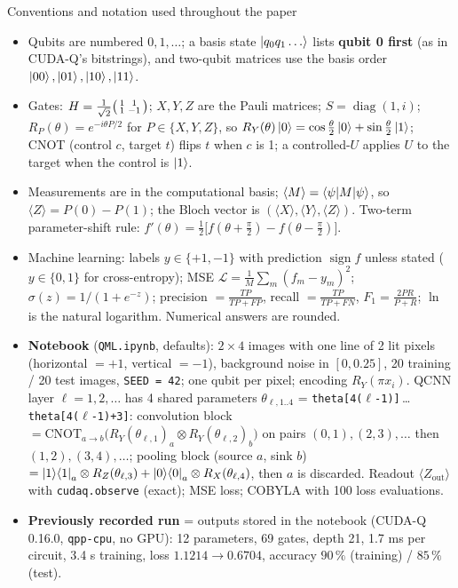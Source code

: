 \documentclass[11pt,a4paper]{article}
\begin{document}
\begin{infobox}{Conventions and notation used throughout the paper}
\footnotesize
\begin{itemize}[leftmargin=1.2em, itemsep=1pt, topsep=2pt]
\item Qubits are numbered $0, 1, \dots$; a basis state $\ket{q_0q_1\dots}$ lists \textbf{qubit 0 first} (as in CUDA-Q's bitstrings), and
      two-qubit matrices use the basis order $\ket{00}, \ket{01}, \ket{10}, \ket{11}$.
\item Gates: $H = \frac{1}{\sqrt2}\begin{psmallmatrix}1&1\\1&-1\end{psmallmatrix}$; $X, Y, Z$ are the Pauli matrices; $S = \operatorname{diag}(1, i)$;
      $R_P(\theta) = e^{-i\theta P/2}$ for $P \in \{X, Y, Z\}$, so $R_Y(\theta)\ket0 = \cos\frac\theta2\ket0 + \sin\frac\theta2\ket1$; CNOT (control $c$,
      target $t$) flips $t$ when $c$ is 1; a controlled-$U$ applies $U$ to the target when the control is $\ket1$.
\item Measurements are in the computational basis; $\langle M\rangle = \braket{\psi|M|\psi}$, so $\langle Z\rangle = P(0) - P(1)$; the Bloch vector is
      $(\langle X\rangle, \langle Y\rangle, \langle Z\rangle)$. Two-term parameter-shift rule: $f'(\theta) = \frac12\big[f(\theta + \frac\pi2) - f(\theta - \frac\pi2)\big]$.
\item Machine learning: labels $y \in \{+1, -1\}$ with prediction $\operatorname{sign}f$ unless stated ($y \in \{0, 1\}$ for cross-entropy);
      MSE $\mathcal L = \frac1M\sum_m(f_m - y_m)^2$; $\sigma(z) = 1/(1 + e^{-z})$; precision $= \frac{TP}{TP + FP}$, recall $= \frac{TP}{TP + FN}$,
      $F_1 = \frac{2PR}{P + R}$; $\ln$ is the natural logarithm. Numerical answers are rounded.
\item \textbf{Notebook} (\texttt{QML.ipynb}, defaults): $2\times4$ images with one line of 2 lit pixels (horizontal $= +1$, vertical $= -1$), background
      noise in $[0, 0.25]$, 20 training / 20 test images, \texttt{SEED = 42}; one qubit per pixel; encoding $R_Y(\pi x_i)$. QCNN
      layer $\ell = 1, 2, \dots$ has 4 shared parameters $\theta_{\ell,1..4}$ = \texttt{theta[4($\ell$-1)]}\,\dots\,\texttt{theta[4($\ell$-1)+3]}:
      convolution block $= \mathrm{CNOT}_{a\to b}\big(R_Y(\theta_{\ell,1})_a\otimes R_Y(\theta_{\ell,2})_b\big)$ on pairs $(0,1), (2,3), \dots$ then $(1,2), (3,4), \dots$;
      pooling block (source $a$, sink $b$) $= \ket1\!\bra1_a\otimes R_Z(\theta_{\ell,3}) + \ket0\!\bra0_a\otimes R_X(\theta_{\ell,4})$, then $a$ is discarded.
      Readout $\langle Z_{\text{out}}\rangle$ with \texttt{cudaq.observe} (exact); MSE loss; COBYLA with 100 loss evaluations.
\item \textbf{Previously recorded run} = outputs stored in the notebook (CUDA-Q 0.16.0, \texttt{qpp-cpu}, no GPU): 12 parameters, 69 gates,
      depth 21, 1.7 ms per circuit, 3.4 s training, loss $1.1214 \to 0.6704$, accuracy $90\,\%$ (training) / $85\,\%$ (test).
\end{itemize}
\end{infobox}
\newpage
\end{document}
